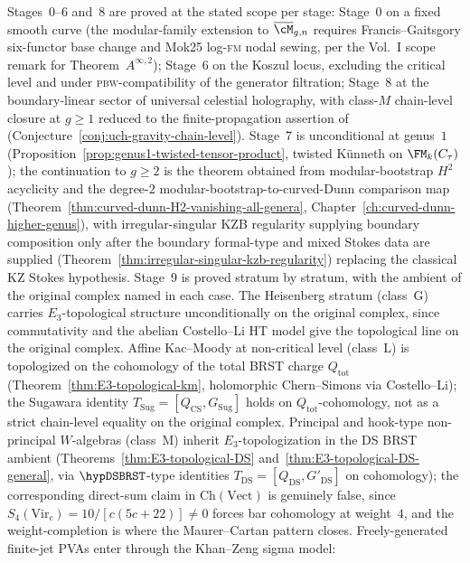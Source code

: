 Stages~0--6 and~8 are proved at the stated scope per stage:
Stage~0 on a fixed smooth curve (the modular-family extension to
$\overline{\cM}_{g,n}$ requires Francis--Gaitsgory
six-functor base change and Mok25 log-\textsc{fm} nodal sewing,
per the Vol.~I scope remark for Theorem~$A^{\infty,2}$);
Stage~6 on the Koszul locus, excluding the critical level and
under \textsc{pbw}-compatibility of the generator filtration;
Stage~8 at the boundary-linear sector of universal celestial
holography, with class-$M$ chain-level closure at $g \ge 1$ reduced
to the finite-propagation assertion of
(Conjecture~\ref{conj:uch-gravity-chain-level}). Stage~7 is
unconditional at genus~$1$
(Proposition~\ref{prop:genus1-twisted-tensor-product}, twisted
K\"unneth on $\FM_k(C_\tau)$); the continuation to $g \ge 2$ is
the theorem obtained from modular-bootstrap $H^2$ acyclicity and
the degree-$2$ modular-bootstrap-to-curved-Dunn comparison map
(Theorem~\ref{thm:curved-dunn-H2-vanishing-all-genera},
Chapter~\ref{ch:curved-dunn-higher-genus}), with irregular-singular
KZB regularity supplying boundary composition only after the
boundary formal-type and mixed Stokes data are supplied
(Theorem~\ref{thm:irregular-singular-kzb-regularity}) replacing
the classical KZ Stokes hypothesis. Stage~9 is proved stratum by
stratum, with the ambient of the original complex named in each
case. The Heisenberg stratum (class~G) carries $E_3$-topological
structure unconditionally on the original complex, since
commutativity and the abelian Costello--Li HT model give the
topological line on the original complex. Affine
Kac--Moody at non-critical level (class~L) is topologized on the
cohomology of the total BRST charge $Q_{\mathrm{tot}}$
(Theorem~\ref{thm:E3-topological-km}, holomorphic Chern--Simons
via Costello--Li); the Sugawara identity
$T_{\mathrm{Sug}} = [Q_{\mathrm{CS}}, G_{\mathrm{Sug}}]$ holds on
$Q_{\mathrm{tot}}$-cohomology, not as a strict chain-level
equality on the original complex. Principal and hook-type
non-principal $W$-algebras (class~M) inherit
$E_3$-topologization in the DS BRST ambient
(Theorems~\ref{thm:E3-topological-DS}
and~\ref{thm:E3-topological-DS-general}, via
\(\hypDSBRST\)-type identities
$T_{\mathrm{DS}} = [Q_{\mathrm{DS}}, G'_{\mathrm{DS}}]$ on
cohomology); the corresponding direct-sum claim in
$\mathrm{Ch}(\mathrm{Vect})$ is genuinely false, since
$S_4(\mathrm{Vir}_c) = 10/[c(5c+22)] \neq 0$ forces bar cohomology
at weight~$4$, and the weight-completion is where the
Ma\-urer--Cartan pattern closes. Freely-generated finite-jet PVAs
enter through the Khan--Zeng sigma model:
